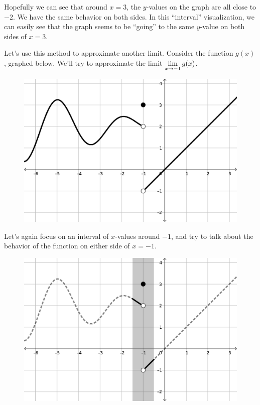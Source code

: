 Hopefully we can see that around $x=3$, the $y$-values on the graph are all close to $-2$.
We have the same behavior on both sides.
In this ``interval'' visualization, we can easily see that the graph seems to be ``going'' to the same $y$-value on both sides of $x=3$.

Let's use this method to approximate another limit. Consider the function $g(x)$, graphed below.
We'll try to approximate the limit $\displaystyle \lim_{x\to-1} g(x)$.

\begin{figure}[h!tb]
  \includegraphics[scale=0.75]{./1_limits/images/1-1_graph2.png}
  \centering
\end{figure}

Let's again focus on an interval of $x$-values around $-1$, and try to talk about the behavior of the function on either side of $x=-1$.

\begin{figure}[h!tb]
  \includegraphics[scale=0.75]{./1_limits/images/1-1_graph2bar1.png}
  \centering
\end{figure}

